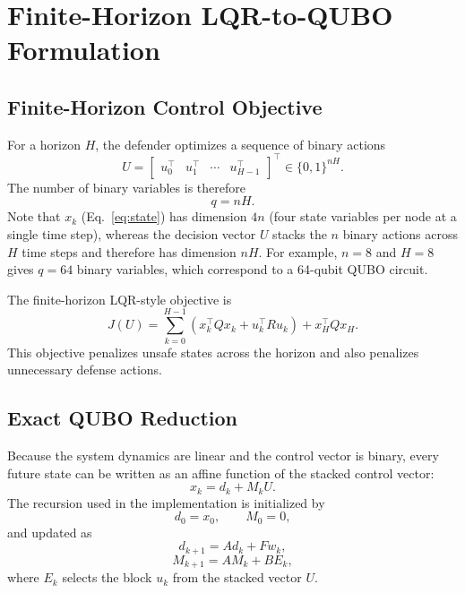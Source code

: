 \documentclass[runningheads]{llncs}
\begin{document}
\section{Finite-Horizon LQR-to-QUBO Formulation}

\subsection{Finite-Horizon Control Objective}

For a horizon $H$, the defender optimizes a sequence of binary actions
\begin{equation}
U=
\begin{bmatrix}
u_0^\top & u_1^\top & \cdots & u_{H-1}^\top
\end{bmatrix}^{\top}
\in \{0,1\}^{nH}.
\end{equation}
The number of binary variables is therefore
\begin{equation}
q=nH.
\end{equation}
Note that $x_k$ (Eq.~\ref{eq:state}) has dimension $4n$ (four state variables per node at a single time step), whereas the decision vector $U$ stacks the $n$ binary actions across $H$ time steps and therefore has dimension $nH$.
For example, $n=8$ and $H=8$ gives $q=64$ binary variables, which correspond to a 64-qubit QUBO circuit.

The finite-horizon LQR-style objective is
\begin{equation}
J(U)=
\sum_{k=0}^{H-1}
\left(x_k^\top Qx_k+u_k^\top Ru_k\right)
+x_H^\top Qx_H.
\label{eq:fhcost}
\end{equation}
This objective penalizes unsafe states across the horizon and also penalizes unnecessary defense actions.

\subsection{Exact QUBO Reduction}

Because the system dynamics are linear and the control vector is binary, every future state can be written as an affine function of the stacked control vector:
\begin{equation}
x_k=d_k+M_kU.
\end{equation}
The recursion used in the implementation is initialized by
\begin{equation}
d_0=x_0,\qquad M_0=0,
\end{equation}
and updated as
\begin{equation}
d_{k+1}=Ad_k+Fw_k,
\end{equation}
\begin{equation}
M_{k+1}=AM_k+BE_k,
\end{equation}
where $E_k$ selects the block $u_k$ from the stacked vector $U$.
\end{document}
